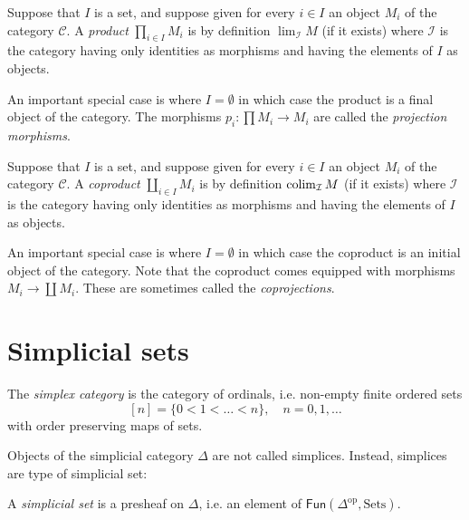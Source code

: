 \begin{definition}
\label{definition-product-as-a-limit}
Suppose that $I$ is a set, and suppose given for every $i \in I$ an
object $M_i$ of the category $\mathcal{C}$. A {\it product}
$\prod_{i\in I} M_i$ is by definition $\lim_\mathcal{I} M$
(if it exists)
where $\mathcal{I}$ is the category having only identities as
morphisms and having the elements of $I$ as objects.
\end{definition}

\noindent
An important special case is where $I = \emptyset$ in which case the
product is a final object of the category.
The morphisms $p_i : \prod M_i \to M_i$ are called the
{\it projection morphisms}.

\begin{definition}
\label{definition-coproduct}
Suppose that $I$ is a set, and suppose given for every $i \in I$ an
object $M_i$ of the category $\mathcal{C}$. A {\it coproduct}
$\coprod_{i\in I} M_i$ is by definition $\mathop{\mathrm{colim}}\nolimits_\mathcal{I} M$
(if it exists) where $\mathcal{I}$ is the category having only
identities as morphisms and having the elements of $I$ as objects.
\end{definition}

\noindent
An important special case is where $I = \emptyset$ in which case the
coproduct is an initial object of the category.
Note that the coproduct comes equipped with morphisms
$M_i \to \coprod M_i$. These are sometimes called the
{\it coprojections}.



\section{Simplicial sets}
\label{section-simplicial-sets}

\begin{definition}
\label{definition-simplex}
The {\it simplex category} is the category of ordinals, i.e.
non-empty finite ordered sets
$$
[n]=\{0<1<\ldots<n\}, \quad n=0,1,\ldots
$$
with order preserving maps of sets.
\end{definition}

Objects of the simplicial category $\Delta$ are not called simplices.
Instead, simplices are type of simplicial set:

\begin{definition}
\label{definition-simplicial-set}
A {\it simplicial set} is a presheaf on $\Delta$, i.e.
an element of $\mathsf{Fun}(\Delta^{\text{op}},\text{Sets})$.
\end{definition}

